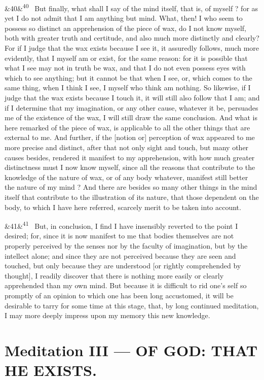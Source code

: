 \documentclass[12pt]{article}
\newcommand{\para}[1][]{\par\noindent\ifx&#1&\else\textsuperscript{\footnotesize #1}~\fi}
\begin{document}
\para[40] But finally, what shall I say of the mind itself, that is, of myself ? for as yet I do not admit that I am anything but mind. What, then! I who seem to possess so distinct an apprehension of the piece of wax, do I not know myself, both with greater truth and certitude, and also much more distinctly and clearly? For if I judge that the wax exists because I see it, it assuredly follows, much more evidently, that I myself am or exist, for the same reason: for it is possible that what I see may not in truth be wax, and that I do not even possess eyes with which to see anything; but it cannot be that when I see, or, which comes to the same thing, when I think I see, I myself who think am nothing. So likewise, if I judge that the wax exists because I touch it, it will still also follow that I am; and if I determine that my imagination, or any other cause, whatever it be, persuades me of the existence of the wax, I will still draw the same conclusion. And what is here remarked of the piece of wax, is applicable to all the other things that are external to me. And further, if the [notion or] perception of wax appeared to me more precise and distinct, after that not only sight and touch, but many other causes besides, rendered it manifest to my apprehension, with how much greater distinctness must I now know myself, since all the reasons that contribute to the knowledge of the nature of wax, or of any body whatever, manifest still better the nature of my mind ? And there are besides so many other things in the mind itself that contribute to the illustration of its nature, that those dependent on the body, to which I have here referred, scarcely merit to be taken into account.

\para[41] But, in conclusion, I find I have insensibly reverted to the point I desired; for, since it is now manifest to me that bodies themselves are not properly perceived by the senses nor by the faculty of imagination, but by the intellect alone; and since they are not perceived because they are seen and touched, but only because they are understood [or rightly comprehended by thought], I readily discover that there is nothing more easily or clearly apprehended than my own mind. But because it is difficult to rid one's self so promptly of an opinion to which one has been long accustomed, it will be desirable to tarry for some time at this stage, that, by long continued meditation, I may more deeply impress upon my memory this new knowledge.

\section*{Meditation III --- OF GOD: THAT HE EXISTS.}
\end{document}
